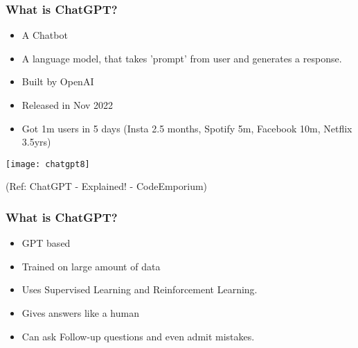 \begin{frame}[fragile]\frametitle{What is ChatGPT?}


\begin{itemize}
\item A Chatbot
\item A language model, that takes 'prompt' from user and generates a response.
\item Built by OpenAI
\item Released in Nov 2022
\item Got 1m users in 5 days  (Insta 2.5 months, Spotify 5m, Facebook 10m, Netflix 3.5yrs)
\end{itemize}	 

			\begin{center}
			\texttt{[image: chatgpt8]}
			\end{center}		
			
			
			{\tiny (Ref: ChatGPT - Explained! - CodeEmporium)}
			
			
\end{frame}

\begin{frame}[fragile]\frametitle{What is ChatGPT?}


\begin{itemize}
\item GPT based
\item Trained on large amount of data
\item Uses Supervised Learning and Reinforcement Learning.
\item Gives answers like a human
\item Can ask Follow-up questions and even admit mistakes.
\end{itemize}	 

\end{frame}

